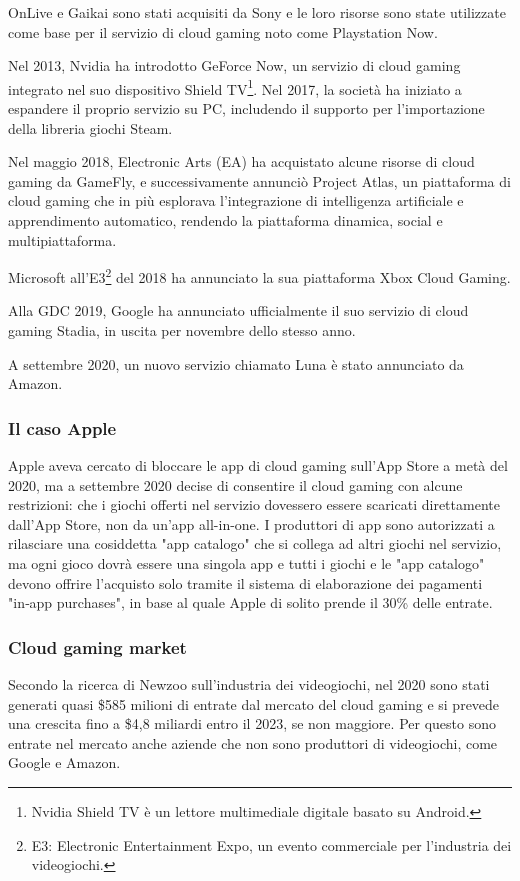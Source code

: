 OnLive e Gaikai sono stati acquisiti da Sony e le loro risorse sono state utilizzate come base per il servizio di cloud gaming noto come Playstation Now.

Nel 2013, Nvidia ha introdotto GeForce Now, un servizio di cloud gaming integrato nel suo dispositivo Shield TV\footnote{Nvidia Shield TV è un lettore multimediale digitale basato su Android.}. Nel 2017, la società ha iniziato a espandere il proprio servizio su PC, includendo il supporto per l'importazione della libreria giochi Steam.

Nel maggio 2018, Electronic Arts (EA) ha acquistato alcune risorse di cloud gaming da GameFly, e successivamente annunciò Project Atlas, un piattaforma di cloud gaming che in più esplorava l'integrazione di intelligenza artificiale e apprendimento automatico, rendendo la piattaforma dinamica, social e multipiattaforma.

Microsoft all'E3\footnote{E3: Electronic Entertainment Expo, un evento commerciale per l'industria dei videogiochi.} del 2018 ha annunciato la sua piattaforma Xbox Cloud Gaming.

Alla GDC 2019, Google ha annunciato ufficialmente il suo servizio di cloud gaming Stadia, in uscita per novembre dello stesso anno.

A settembre 2020, un nuovo servizio chiamato Luna è stato annunciato da Amazon\cite{Cloud_gaming_history}.

\subsubsection{Il caso Apple}
Apple aveva cercato di bloccare le app di cloud gaming sull'App Store a metà del 2020, ma a settembre 2020 decise di consentire il cloud gaming con alcune restrizioni: che i giochi offerti nel servizio dovessero essere scaricati direttamente dall'App Store, non da un'app all-in-one. I produttori di app sono autorizzati a rilasciare una cosiddetta "app catalogo" che si collega ad altri giochi nel servizio, ma ogni gioco dovrà essere una singola app e tutti i giochi e le "app catalogo" devono offrire l'acquisto solo tramite il sistema di elaborazione dei pagamenti "in‑app purchases", in base al quale Apple di solito prende il 30\% delle entrate\cite{Apple_controversy}.

\subsubsection{Cloud gaming market}
Secondo la ricerca di Newzoo sull'industria dei videogiochi, nel 2020 sono stati generati quasi \$585 milioni di entrate dal mercato del cloud gaming e si prevede una crescita fino a \$4,8 miliardi entro il 2023, se non maggiore. Per questo sono entrate nel mercato anche aziende che non sono produttori di videogiochi, come Google e Amazon.

